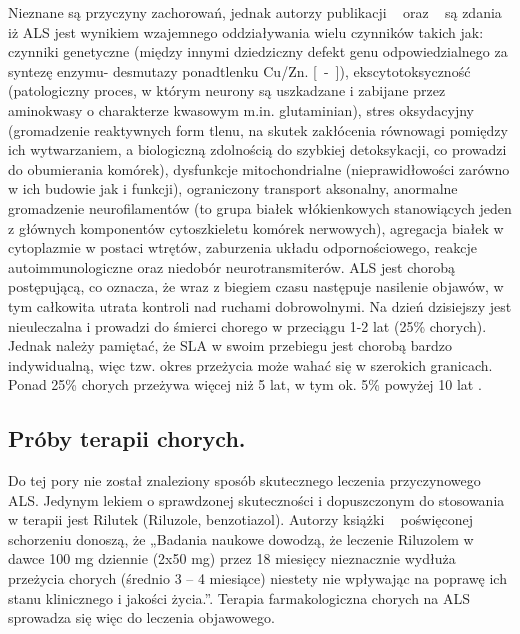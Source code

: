 \documentclass[twoside,a4paper]{book}
\begin{document}
Nieznane są przyczyny zachorowań, jednak autorzy publikacji ~\cite{alsWij} oraz ~\cite{motoneuron} są zdania iż ALS jest wynikiem wzajemnego oddziaływania wielu czynników takich jak: czynniki genetyczne (między innymi dziedziczny defekt genu odpowiedzialnego za syntezę enzymu- desmutazy ponadtlenku Cu/Zn. [~\cite{neurology}-~\cite{alsWij}]), ekscytotoksyczność (patologiczny proces, w którym neurony są uszkadzane i zabijane przez aminokwasy o charakterze kwasowym m.in. glutaminian), stres oksydacyjny (gromadzenie reaktywnych form tlenu, na skutek zakłócenia równowagi pomiędzy ich wytwarzaniem, a biologiczną zdolnością do szybkiej detoksykacji, co prowadzi do obumierania komórek), dysfunkcje mitochondrialne (nie\-pra\-wi\-dło\-woś\-ci zarówno w ich budowie jak i funkcji), ograniczony transport aksonalny, anormalne gromadzenie neurofilamentów (to grupa białek włókienkowych stanowiących jeden z głównych komponentów cytoszkieletu komórek nerwowych), agregacja białek w cytoplazmie w postaci wtrętów, zaburzenia układu odpornościowego, reakcje autoimmunologiczne oraz niedobór neurotransmiterów.
ALS jest chorobą postępującą, co oznacza, że wraz z biegiem czasu następuje nasilenie objawów, w tym całkowita utrata kontroli nad ruchami dobrowolnymi. Na dzień dzisiejszy jest nieuleczalna i prowadzi do śmierci chorego w przeciągu 1-2 lat (25\% chorych). Jednak należy pamiętać, że SLA w swoim przebiegu jest chorobą bardzo indywidualną, więc tzw. okres przeżycia może wahać się w szerokich granicach. Ponad 25\% chorych przeżywa więcej niż 5 lat, w tym ok. 5\%  powyżej 10 lat .~\cite{poradnik}
\subsection{Próby terapii chorych.}

Do tej pory nie został znaleziony sposób skutecznego leczenia przyczynowego ALS. Jedynym lekiem o sprawdzonej skuteczności i dopuszczonym do stosowania w terapii  jest Rilutek (Riluzole, benzotiazol). Autorzy książki ~\cite{alsAdamek} poświęconej schorzeniu donoszą, że  „Badania  naukowe  dowodzą, że leczenie Riluzolem w dawce 100 mg dziennie (2x50 mg) przez 18 miesięcy nieznacznie  wydłuża  przeżycia  chorych  (średnio 3 – 4 miesiące)  niestety  nie  wpływając  na  poprawę  ich  stanu  klinicznego  i  jakości życia.”.  Terapia farmakologiczna chorych na ALS sprowadza się więc do leczenia objawowego.  
\end{document}
